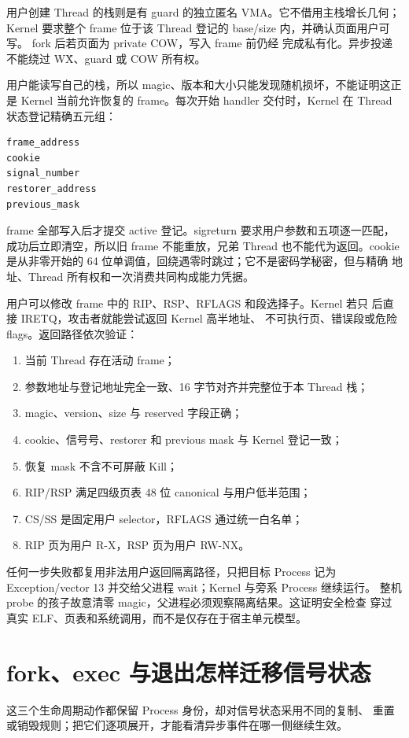用户创建 Thread 的栈则是有 guard 的独立匿名 VMA。它不借用主栈增长几何；
Kernel 要求整个 frame 位于该 Thread 登记的 base/size 内，并确认页面用户可写。
fork 后若页面为 private COW，写入 frame 前仍经
 完成私有化。异步投递不能绕过 W\^X、guard
或 COW 所有权。

用户能读写自己的栈，所以 magic、版本和大小只能发现随机损坏，不能证明这正是
Kernel 当前允许恢复的 frame。每次开始 handler 交付时，Kernel 在 Thread
状态登记精确五元组：

\begin{lstlisting}
frame_address
cookie
signal_number
restorer_address
previous_mask
\end{lstlisting}

frame 全部写入后才提交 active 登记。sigreturn 要求用户参数和五项逐一匹配，
成功后立即清空，所以旧 frame 不能重放，兄弟 Thread 也不能代为返回。cookie
是从非零开始的 64 位单调值，回绕遇零时跳过；它不是密码学秘密，但与精确
地址、Thread 所有权和一次消费共同构成能力凭据。

用户可以修改 frame 中的 RIP、RSP、RFLAGS 和段选择子。Kernel 若只
 后直接 IRETQ，攻击者就能尝试返回 Kernel 高半地址、
不可执行页、错误段或危险 flags。返回路径依次验证：

\begin{enumerate}
  \item 当前 Thread 存在活动 frame；
  \item 参数地址与登记地址完全一致、16 字节对齐并完整位于本 Thread 栈；
  \item magic、version、size 与 reserved 字段正确；
  \item cookie、信号号、restorer 和 previous mask 与 Kernel 登记一致；
  \item 恢复 mask 不含不可屏蔽 Kill；
  \item RIP/RSP 满足四级页表 48 位 canonical 与用户低半范围；
  \item CS/SS 是固定用户 selector，RFLAGS 通过统一白名单；
  \item RIP 页为用户 R-X，RSP 页为用户 RW-NX。
\end{enumerate}

任何一步失败都复用非法用户返回隔离路径，只把目标 Process 记为
Exception/vector 13 并交给父进程 wait；Kernel 与旁系 Process 继续运行。
整机 probe 的孩子故意清零 magic，父进程必须观察隔离结果。这证明安全检查
穿过真实 ELF、页表和系统调用，而不是仅存在于宿主单元模型。

\section{fork、exec 与退出怎样迁移信号状态}
这三个生命周期动作都保留 Process 身份，却对信号状态采用不同的复制、
重置或销毁规则；把它们逐项展开，才能看清异步事件在哪一侧继续生效。

